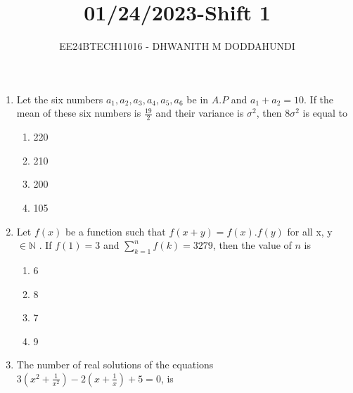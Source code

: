 \documentclass[journal]{IEEEtran}
\begin{document}

\vspace{3cm}

\title{01/24/2023-Shift 1}
\author{EE24BTECH11016 - DHWANITH M DODDAHUNDI}

{\let\newpage\relax\maketitle}

\renewcommand{\thefigure}{\theenumi}
\renewcommand{\thetable}{\theenumi}
\setlength{\intextsep}{10pt} %

\begin{enumerate}
\setcounter{enumi}{0}
    \item Let the six numbers $a_{1},a_{2},a_{3},a_{4},a_{5},a_{6}$ be in $A.P$ and $a_{1}+a_{2}=10$. If the mean of these six numbers is $ \frac{19}{2} $ and their variance is $\sigma^{2}$, then 8$\sigma^{2}$ is equal to 
    \begin{enumerate}
        \item 220
        \item 210
        \item 200
        \item 105
    \end{enumerate}
    \item Let $f(x)$ be a function such that $f(x+y)=f(x).f(y)$ for all x, y $\in \mathbb{N}$ . If  $ f(1)=3 $  and  $ \sum_{k=1}^{n} f(k)= 3279$, then the value of $n$ is
    \begin{enumerate}
        \item 6
        \item 8
        \item 7
        \item 9
    \end{enumerate} 
    \item The number of real solutions of the equations $3\left( x^{2}+\frac{1}{x^{2}} \right)-2\left( x+\frac{1}{x} \right)+5=0$, is
    \begin{enumerate}
        

\end{enumerate}
\end{enumerate}
\end{document}
